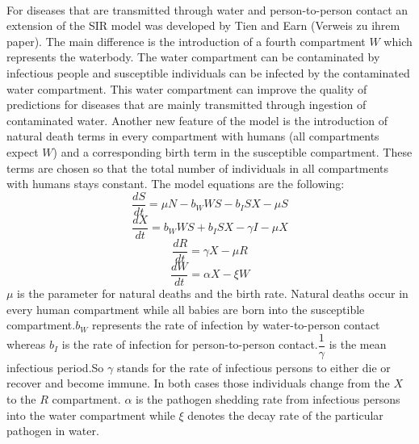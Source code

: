 \documentclass[11pt]{article}
\begin{document}
\\For diseases that are transmitted through water and person-to-person contact an extension of the SIR model was developed by Tien and Earn (Verweis zu ihrem paper). The main difference is the introduction of a fourth compartment $ W $ which represents the waterbody. The water compartment can be contaminated by infectious people and susceptible individuals can be infected by the contaminated water compartment. This water compartment can improve the quality of predictions for diseases that are mainly transmitted through ingestion of contaminated water.
\linebreak
Another new feature of the model is the introduction of natural death terms in every compartment with humans (all compartments expect $ W $) and a corresponding birth term in the susceptible compartment. These terms are chosen so that the total number of individuals in all compartments with humans stays constant.
The model equations are the following:
\begin{equation*}
\dfrac{dS}{dt}=\mu N-b_{W}WS-b_{I}SX-\mu S 
\end{equation*}
\begin{equation*}
\dfrac{dX}{dt}=b_{W}WS+b_{I}SX-\gamma I-\mu X
\end{equation*}
\begin{equation*}
\dfrac{dR}{dt}=\gamma X-\mu R
\end{equation*}
\begin{equation*}
\dfrac{dW}{dt}=\alpha X-\xi W
\end{equation*}
$ \mu $ is the parameter for natural deaths and the birth rate. Natural deaths occur in every human compartment while all babies are born into the susceptible compartment.$ b_{W} $ represents the rate of infection by water-to-person contact whereas $ b_{I} $ is the rate of infection for person-to-person contact.$ \dfrac{1}{\gamma } $ is the mean infectious period.So $ \gamma $ stands for the rate of infectious persons to either die or recover and become immune. In both cases those individuals change from the $ X $ to the $ R $ compartment. $ \alpha $ is the pathogen shedding rate from infectious persons into the water compartment while $ \xi $ denotes the decay rate of the particular pathogen in water.
\\
\end{document}
